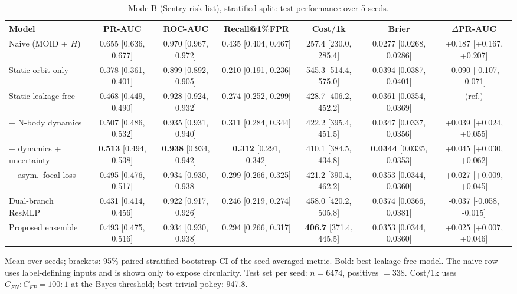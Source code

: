 \begin{table}[t]
\centering
\small
\caption{Mode B (Sentry risk list), stratified split: test performance over 5 seeds.}
\label{tab:sentry_stratified_all}
\begin{tabular}{lcccccc}
\toprule
Model & PR-AUC & ROC-AUC & Recall@1\%FPR & Cost/1k & Brier & $\Delta$PR-AUC \\
\midrule
Naive (MOID + $H$) & 0.655 \scriptsize{[0.636, 0.677]} & 0.970 \scriptsize{[0.967, 0.972]} & 0.435 \scriptsize{[0.404, 0.467]} & 257.4 \scriptsize{[230.0, 285.4]} & 0.0277 \scriptsize{[0.0268, 0.0286]} & +0.187 \scriptsize{[+0.167, +0.207]} \\
\midrule
Static orbit only & 0.378 \scriptsize{[0.361, 0.401]} & 0.899 \scriptsize{[0.892, 0.905]} & 0.210 \scriptsize{[0.191, 0.236]} & 545.3 \scriptsize{[514.4, 575.0]} & 0.0394 \scriptsize{[0.0387, 0.0401]} & -0.090 \scriptsize{[-0.107, -0.071]} \\
Static leakage-free & 0.468 \scriptsize{[0.449, 0.490]} & 0.928 \scriptsize{[0.924, 0.932]} & 0.274 \scriptsize{[0.252, 0.299]} & 428.7 \scriptsize{[406.2, 452.2]} & 0.0361 \scriptsize{[0.0354, 0.0369]} & (ref.) \\
+ N-body dynamics & 0.507 \scriptsize{[0.486, 0.532]} & 0.935 \scriptsize{[0.931, 0.940]} & 0.311 \scriptsize{[0.284, 0.344]} & 422.2 \scriptsize{[395.4, 451.5]} & 0.0347 \scriptsize{[0.0337, 0.0356]} & +0.039 \scriptsize{[+0.024, +0.055]} \\
+ dynamics + uncertainty & \textbf{0.513} \scriptsize{[0.494, 0.538]} & \textbf{0.938} \scriptsize{[0.934, 0.942]} & \textbf{0.312} \scriptsize{[0.291, 0.342]} & 410.1 \scriptsize{[384.5, 434.8]} & \textbf{0.0344} \scriptsize{[0.0335, 0.0353]} & +0.045 \scriptsize{[+0.030, +0.062]} \\
+ asym.\ focal loss & 0.495 \scriptsize{[0.476, 0.517]} & 0.934 \scriptsize{[0.930, 0.938]} & 0.299 \scriptsize{[0.266, 0.325]} & 421.2 \scriptsize{[390.4, 462.2]} & 0.0353 \scriptsize{[0.0344, 0.0360]} & +0.027 \scriptsize{[+0.009, +0.045]} \\
Dual-branch ResMLP & 0.431 \scriptsize{[0.414, 0.456]} & 0.922 \scriptsize{[0.917, 0.926]} & 0.246 \scriptsize{[0.219, 0.274]} & 458.0 \scriptsize{[420.2, 505.8]} & 0.0374 \scriptsize{[0.0366, 0.0381]} & -0.037 \scriptsize{[-0.058, -0.015]} \\
Proposed ensemble & 0.493 \scriptsize{[0.475, 0.516]} & 0.934 \scriptsize{[0.930, 0.938]} & 0.294 \scriptsize{[0.266, 0.317]} & \textbf{406.7} \scriptsize{[371.4, 445.5]} & 0.0353 \scriptsize{[0.0344, 0.0360]} & +0.025 \scriptsize{[+0.007, +0.046]} \\
\bottomrule
\end{tabular}
\par\vspace{2pt}\footnotesize Mean over seeds; brackets: 95\% paired stratified-bootstrap CI of the seed-averaged metric. Bold: best leakage-free model. The naive row uses label-defining inputs and is shown only to expose circularity. Test set per seed: $n=6474$, positives $=338$. Cost/1k uses $C_{FN}{:}C_{FP}=100{:}1$ at the Bayes threshold; best trivial policy: 947.8.
\end{table}
